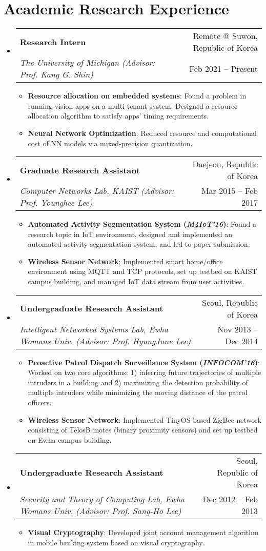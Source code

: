\documentclass[letterpaper,oneside,11pt]{article}
\makeatletter
\newcommand{\resumeItem}[2]{
  \item\small{
    \textbf{#1}{: #2 \vspace{-2pt}}
  }
}
\newcommand{\resumeSubheading}[4]{
  \vspace{-2pt}\item
    \begin{tabularx}{0.97\textwidth}[t]{X@{\hspace{-5pt}}r}
      \textbf{#1} & #2 \\
      \textit{\small#3} & \small #4 \\
    \end{tabularx}\vspace{-6pt}
}
\newcommand{\resumeSubHeadingListStart}{\begin{itemize}[leftmargin=*]}
\newcommand{\resumeSubHeadingListEnd}{\end{itemize}}
\newcommand{\resumeItemListStart}{\begin{itemize}}
\newcommand{\resumeItemListEnd}{\end{itemize}\vspace{-5pt}}
\makeatother
\begin{document}
\section{Academic Research Experience}
  \resumeSubHeadingListStart
    \resumeSubheading
      {Research Intern}{Remote @ Suwon, Republic of Korea}
      {The University of Michigan (Advisor: Prof. Kang G. Shin)}{Feb 2021 -- Present}
      \resumeItemListStart
        \resumeItem{Resource allocation on embedded systems}{Found a problem in running vision apps on a multi-tenant system. Designed a resource allocation algorithm to satisfy apps' timing requirements.}
        \resumeItem{Neural Network Optimization}{Reduced resource and computational cost of NN models via mixed-precision quantization.}
      \resumeItemListEnd
    \resumeSubheading
      {Graduate Research Assistant}{Daejeon, Republic of Korea}
      {Computer Networks Lab, KAIST (Advisor: Prof. Younghee Lee)}{Mar 2015 -- Feb 2017}
      \resumeItemListStart
        \resumeItem{Automated Activity Segmentation System (\textit{\textbf{M4IoT'16}})}{Found a research topic in IoT environment, designed and implemented an automated activity segmentation system, and led to paper submission.}
        \resumeItem{Wireless Sensor Network}{Implemented smart home/office environment using MQTT and TCP protocols, set up testbed on KAIST campus building, and managed IoT data stream from user activities.}
      \resumeItemListEnd
    \resumeSubheading
      {Undergraduate Research Assistant}{Seoul, Republic of Korea}
      {Intelligent Networked Systems Lab, Ewha Womans Univ. (Advisor: Prof. HyungJune Lee)}{Nov 2013 -- Dec 2014}
      \resumeItemListStart   
        \resumeItem{Proactive Patrol Dispatch Surveillance System (\textit{\textbf{INFOCOM'16}})}{Worked on two core algorithms: 1) inferring future trajectories of multiple intruders in a building and 2) maximizing the detection probability of multiple intruders while minimizing the moving distance of the patrol officers.}
        \resumeItem{Wireless Sensor Network}{Implemented TinyOS-based ZigBee network consisting of TelosB motes (binary proximity sensors) and set up testbed on Ewha campus building.}
      \resumeItemListEnd
    \resumeSubheading
      {Undergraduate Research Assistant}{Seoul, Republic of Korea}
      {Security and Theory of Computing Lab, Ewha Womans Univ. (Advisor: Prof. Sang-Ho Lee)}{Dec 2012 -- Feb 2013}
      \resumeItemListStart
        \resumeItem{Visual Cryptography}{Developed joint account management algorithm in mobile banking system based on visual cryptography.}
      \resumeItemListEnd
  \resumeSubHeadingListEnd
\end{document}
